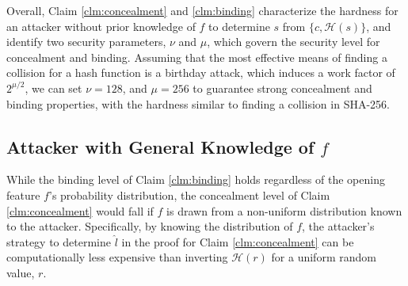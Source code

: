 
Overall, Claim \ref{clm:concealment} and \ref{clm:binding} characterize the hardness for an attacker without prior knowledge of $f$ to determine $s$ from $\{c, \mathcal{H}(s)\}$, and identify two security parameters, $\nu$ and $\mu$, which govern the security level for concealment and binding. Assuming that the most effective means of finding a collision for a hash function is a birthday attack, which induces a work factor of $2^{\mu/2}$, we can set $\nu = 128$, and $\mu = 256$ to guarantee strong concealment and binding properties, with the hardness similar to finding a collision in SHA-256.

\subsection{Attacker with General Knowledge of $f$}
While the binding level of Claim \ref{clm:binding} holds regardless of the opening feature $f$'s probability distribution, the concealment level of Claim \ref{clm:concealment} would fall if $f$ is drawn from a non-uniform distribution known to the attacker. Specifically, by knowing the distribution of $f$, the attacker's strategy to determine $\hat{l}$ in the proof for Claim \ref{clm:concealment} can be computationally less expensive than inverting $\mathcal{H}(r)$ for a uniform random value, $r$. 



